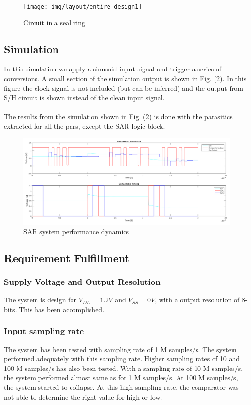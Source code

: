 \documentclass[english, 12pt, a4paper]{ifimaster}
\begin{document}
\begin{figure}
 \centering
 \texttt{[image: img/layout/entire\_design1]}
 \caption{Circuit in a seal ring}
 \label{fig:seal:ring}
\end{figure}


\subsection{Simulation}
In this simulation we apply a sinusoid input signal and trigger a series of conversions. A small section of the simulation output is shown in Fig. (\ref{fig:system:dynamics}). 
In this figure the clock signal is not included (but can be inferred) and the output from S/H circuit is shown instead of the clean input signal.\\
\\
The results from the simulation shown in Fig. (\ref{fig:system:dynamics}) is done with the parasitics extracted for all the pars, except the SAR logic block. 
 
 \begin{figure}[!ht]
  \centering
  \includegraphics[width=\textwidth]{img/system/sar_system_dynamics}
  \caption{SAR system performance dynamics}
  \label{fig:system:dynamics}
 \end{figure}
 
\subsection{Requirement Fulfillment}


\subsubsection{Supply Voltage and Output Resolution}
The system is design for \(V_{DD} = 1.2V\) and \(V_{SS} = 0V \), with a output resolution of 8-bits. This has been accomplished.  

\subsubsection{Input sampling rate}
The system has been tested with sampling rate of 1 M samples/s. The system performed adequately with this sampling rate. Higher sampling rates of 10 and 100 M samples/s has also 
been tested. With a sampling rate of 10 M samples/s, the system performed almost same as for 1 M samples/s. At 100 M samples/s, the system started to collapse. At this high 
sampling rate, the comparator was not able to determine the right value for high or low. 
\end{document}
